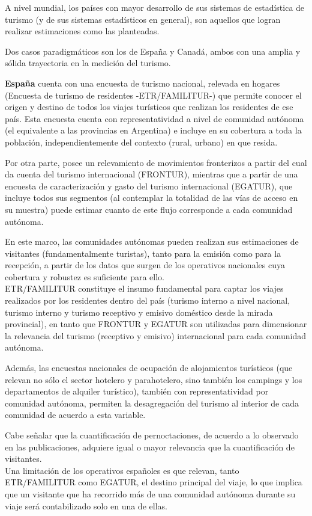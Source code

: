 \documentclass[
  openany]{book}
\begin{document}
A nivel mundial, los países con mayor desarrollo de sus sistemas de estadística de turismo (y de sus sistemas estadísticos en general), son aquellos que logran realizar estimaciones como las planteadas.

Dos casos paradigmáticos son los de España y Canadá, ambos con una amplia y sólida trayectoria en la medición del turismo.

\textbf{España} cuenta con una encuesta de turismo nacional, relevada en hogares (Encuesta de turismo de residentes -ETR/FAMILITUR-) que permite conocer el origen y destino de todos los viajes turísticos que realizan los residentes de ese país. Esta encuesta cuenta con representatividad a nivel de comunidad autónoma (el equivalente a las provincias en Argentina) e incluye en su cobertura a toda la población, independientemente del contexto (rural, urbano) en que resida.

Por otra parte, posee un relevamiento de movimientos fronterizos a partir del cual da cuenta del turismo internacional (FRONTUR), mientras que a partir de una encuesta de caracterización y gasto del turismo internacional (EGATUR), que incluye todos sus segmentos (al contemplar la totalidad de las vías de acceso en su muestra) puede estimar cuanto de este flujo corresponde a cada comunidad autónoma.

En este marco, las comunidades autónomas pueden realizan sus estimaciones de visitantes (fundamentalmente turistas), tanto para la emisión como para la recepción, a partir de los datos que surgen de los operativos nacionales cuya cobertura y robustez es suficiente para ello.\\
ETR/FAMILITUR constituye el insumo fundamental para captar los viajes realizados por los residentes dentro del país (turismo interno a nivel nacional, turismo interno y turismo receptivo y emisivo doméstico desde la mirada provincial), en tanto que FRONTUR y EGATUR son utilizadas para dimensionar la relevancia del turismo (receptivo y emisivo) internacional para cada comunidad autónoma.

Además, las encuestas nacionales de ocupación de alojamientos turísticos (que relevan no sólo el sector hotelero y parahotelero, sino también los campings y los departamentos de alquiler turístico), también con representatividad por comunidad autónoma, permiten la desagregación del turismo al interior de cada comunidad de acuerdo a esta variable.

Cabe señalar que la cuantificación de pernoctaciones, de acuerdo a lo observado en las publicaciones, adquiere igual o mayor relevancia que la cuantificación de visitantes.\\
Una limitación de los operativos españoles es que relevan, tanto ETR/FAMILITUR como EGATUR, el destino principal del viaje, lo que implica que un visitante que ha recorrido más de una comunidad autónoma durante su viaje será contabilizado solo en una de ellas.
\end{document}
